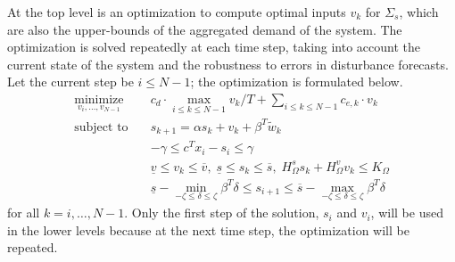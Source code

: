 At the top level is an optimization to compute optimal inputs $v_{k}$ for $\Sigma_{s}$, which are also the upper-bounds of the aggregated demand of the system.
%
%
The %
optimization is solved repeatedly at each time step, taking into account the current state of the system and the robustness to errors in disturbance forecasts.
Let the current step be $i \leqslant N-1$; the optimization is formulated below.
\begin{align*}
  \operatorname*{minimize}_{v_{i}, \ldots, v_{N - 1}} \quad & c_d \cdot \max_{i
  \leqslant k \leqslant N - 1} v_k / T + \textstyle\sum_{i \leqslant k \leqslant N - 1}
  c_{e, k} \cdot v_k \\
  \text{subject to} \quad & s_{k+1} = \alpha s_{k} + v_{k} + \beta^{T} \tilde{w}_{k}  \nonumber\\
  & -\gamma \leqslant c^{T} x_{i} - s_{i} \leqslant \gamma \\
  & \underline{v} \leqslant v_{k} \leqslant \overbar{v}, \; \underline{s} \leqslant s_{k} \leqslant \overbar{s}, \; H_{\Omega}^{s} s_{k} + H_{\Omega}^{v} v_{k} \leqslant K_{\Omega} \\
  & \underline{s} - \min_{-\zeta \leqslant \delta \leqslant  \zeta} \beta^{T} \delta \leqslant s_{i+1} \leqslant \overbar{s} - \max_{-\zeta \leqslant \delta \leqslant \zeta} \beta^{T} \delta
\end{align*}
for all $k=i,\dots,N-1$.
Only the first step of the solution, \ie $s_{i}$ and $v_{i}$, will be used in the lower levels because at the next time step, the optimization will be repeated.

